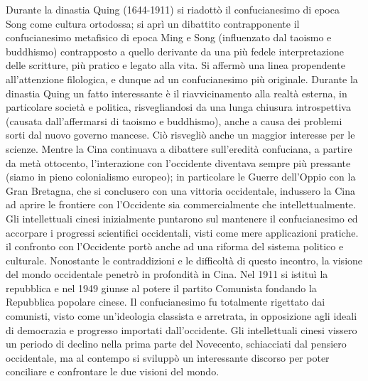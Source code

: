 \documentclass[10pt,a4paper]{report}
\begin{document}
Durante la dinastia Quing (1644-1911) si riadottò il confucianesimo di epoca Song come cultura ortodossa; si aprì un dibattito contrapponente il confucianesimo metafisico di epoca Ming e Song (influenzato dal taoismo e buddhismo) contrapposto a quello derivante da una più fedele interpretazione delle scritture, più pratico e legato alla vita. Si affermò una linea propendente all'attenzione filologica, e dunque ad un confucianesimo più originale. Durante la dinastia Quing un fatto interessante è il riavvicinamento alla realtà esterna, in particolare società e politica, risvegliandosi da una lunga chiusura introspettiva (causata dall'affermarsi di taoismo e buddhismo), anche a causa dei problemi sorti dal nuovo governo mancese. Ciò risvegliò anche un maggior interesse per le scienze. Mentre la Cina continuava a dibattere sull'eredità confuciana, a partire da metà ottocento, l'interazione con l'occidente diventava sempre più pressante (siamo in pieno colonialismo europeo); in particolare le Guerre dell'Oppio con la Gran Bretagna, che si conclusero con una vittoria occidentale, indussero la Cina ad aprire le frontiere con l'Occidente sia commercialmente che intellettualmente. Gli intellettuali cinesi inizialmente puntarono sul mantenere il confucianesimo ed accorpare i progressi scientifici occidentali, visti come mere applicazioni pratiche. il confronto con l'Occidente portò anche ad una riforma del sistema politico e culturale. Nonostante le contraddizioni e le difficoltà di questo incontro, la visione del mondo occidentale penetrò in profondità in Cina. Nel 1911 si istituì la repubblica e nel 1949 giunse al potere il partito Comunista fondando la Repubblica popolare cinese. Il confucianesimo fu totalmente rigettato dai comunisti, visto come un'ideologia classista e arretrata, in opposizione agli ideali di democrazia e progresso importati dall'occidente. Gli intellettuali cinesi vissero un periodo di declino nella prima parte del Novecento, schiacciati dal pensiero occidentale, ma al contempo si sviluppò un interessante discorso per poter conciliare e confrontare le due visioni del mondo.\\
\end{document}
